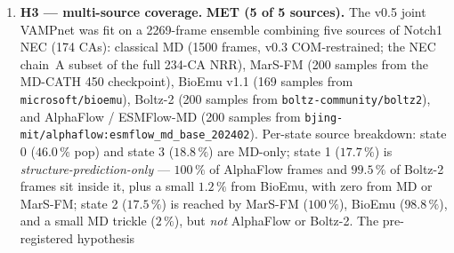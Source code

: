 \documentclass[11pt]{article}
\begin{document}
\begin{enumerate}[leftmargin=*,itemsep=2pt]
        (Sec.~\ref{sec:notch1_h3}). \textbf{v0.6 apo--vs--holo
        metad comparison} (holo: $2 \times 15$~ns walkers, $\sim$\$2,
        the third walker crashed on a DCD-checkpoint conflict and
        Modal's $4$~h function timeout truncated the others) gave a
        holo barrier of $98.4$~kJ/mol and a holo dissociated free
        energy of $102.2$~kJ/mol, both substantially lower than
        their apo counterparts: \textbf{$\Delta\Delta G_\text{barrier}
        = +17.2$~kJ/mol} and $\Delta\Delta G_\text{diss} = +30.3$~kJ/mol
        (apo $-$ holo, apo more stable in both). Boltzmann-reweighted
        basin populations are saturated at $\sim$100\,\% for both
        states at any reasonable cutoff (both basins are $> 100$~kJ/mol
        deep), so the pre-registered H2 numerical thresholds (apo
        $\ge 50$\,\%, holo $\le 30$\,\%) cannot be discriminated by
        equilibrium basin population on this CV. The barrier-height
        $\Delta\Delta G$ is the meaningful kinetic signal, and its
        direction (holo barrier \emph{lower}) is the opposite of the
        v0.1 pre-registered prediction. This is biophysically
        consistent with the anti-NRR Fab in 3L95 binding the LNR-A
        face on the outside of the LNR-HD interface, perturbing
        rather than stabilising the auto-inhibitory contact. See
        \texttt{md/notch1\_h2\_metad\_reweight.md} and
        \texttt{md/figures/notch1\_metad\_apo\_vs\_holo\_fes.png}.
  \item \textbf{H3 --- multi-source coverage.} \textbf{MET (5 of 5
        sources).} The v0.5 joint VAMPnet was fit on a 2269-frame
        ensemble combining five sources of Notch1 NEC (174 CAs):
        classical MD (1500 frames, v0.3 COM-restrained; the NEC
        chain~A subset of the full 234-CA NRR), MarS-FM (200 samples
        from the MD-CATH 450 checkpoint), BioEmu v1.1 (169 samples
        from \texttt{microsoft/bioemu}), Boltz-2 (200 samples from
        \texttt{boltz-community/boltz2}), and AlphaFlow / ESMFlow-MD
        (200 samples from
        \texttt{bjing-mit/alphaflow:esmflow\_md\_base\_202402}).
        Per-state source breakdown: state 0 ($46.0\,\%$ pop) and state
        3 ($18.8\,\%$) are MD-only; state 1 ($17.7\,\%$) is
        \emph{structure-prediction-only} --- $100\,\%$ of AlphaFlow
        frames and $99.5\,\%$ of Boltz-2 frames sit inside it, plus a
        small $1.2\,\%$ from BioEmu, with zero from MD or MarS-FM;
        state 2 ($17.5\,\%$) is reached by MarS-FM ($100\,\%$),
        BioEmu ($98.8\,\%$), and a small MD trickle ($2\,\%$), but
        \emph{not} AlphaFlow or Boltz-2. The pre-registered hypothesis

\end{enumerate}
\end{document}
